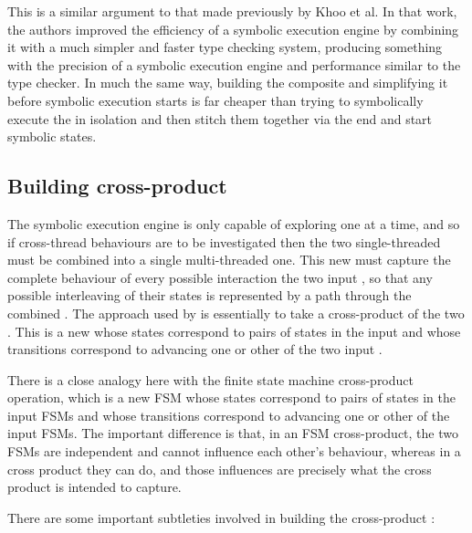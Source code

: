This is a similar argument to that made previously by Khoo et
al\cite{Khoo2010}.  In that work, the authors improved the efficiency
of a symbolic execution engine by combining it with a much simpler and
faster type checking system, producing something with the precision of
a symbolic execution engine and performance similar to the type
checker.  In much the same way, building the composite {\StateMachine}
and simplifying it before symbolic execution starts is far cheaper
than trying to symbolically execute the {\StateMachines} in isolation
and then stitch them together via the end and start symbolic states.


\subsection{Building cross-product {\StateMachines}}
\label{sect:using:build_cross_product}

The symbolic execution engine is only capable of exploring one
{\StateMachine} at a time, and so if cross-thread behaviours are to be
investigated then the two single-threaded {\StateMachines} must be
combined into a single multi-threaded one.  This new {\StateMachine}
must capture the complete behaviour of every possible interaction the
two input {\StateMachines}, so that any possible interleaving of their
states is represented by a path through the combined {\StateMachine}.
The approach used by {\technique} is essentially to take a
cross-product of the two {\StateMachines}.  This is a new
{\StateMachine} whose states correspond to pairs of states in the
input {\StateMachine} and whose transitions correspond to advancing
one or other of the two input {\StateMachines}.

There is a close analogy here with the finite state machine
cross-product operation, which is a new FSM whose states correspond to
pairs of states in the input FSMs and whose transitions correspond to
advancing one or other of the input FSMs.  The important difference is
that, in an FSM cross-product, the two FSMs are independent and cannot
influence each other's behaviour, whereas in a {\StateMachine} cross
product they can do, and those influences are precisely what the cross
product is intended to capture.

There are some important subtleties involved in building the
cross-product {\StateMachine}:

